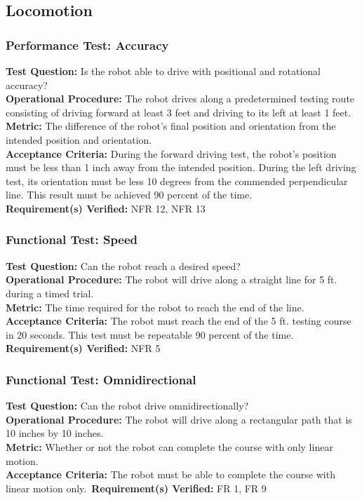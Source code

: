 
\subsection{Locomotion}
\label{sec:verification_locomotion}

\subsubsection{Performance Test: Accuracy}
\label{test:locomotion_pt_accuracy}
\textbf{Test Question:} Is the robot able to drive with positional and rotational accuracy?\\
\textbf{Operational Procedure:} The robot drives along a predetermined testing route consisting of driving forward at least 3 feet and driving to its left at least 1 feet.\\
\textbf{Metric:} The difference of the robot's final position and orientation from the intended position and orientation. \\
\textbf{Acceptance Criteria:} During the forward driving test, the robot's position must be less than 1 inch away from the intended position. During the left driving test, its orientation must be less 10 degrees from the commended perpendicular line. This result must be achieved 90 percent of the time.\\
\textbf{Requirement(s) Verified:} NFR 12, NFR 13

\subsubsection{Functional Test: Speed}
\label{test:locomotion_ft_speed}
\textbf{Test Question:} Can the robot reach a desired speed? \\
\textbf{Operational Procedure:} The robot will drive along a straight line for 5 ft. during a timed trial.\\
\textbf{Metric:} The time required for the robot to reach the end of the line.\\
\textbf{Acceptance Criteria:} The robot must reach the end of the 5 ft. testing course in 20 seconds. This test must be repeatable 90 percent of the time. \\
\textbf{Requirement(s) Verified:} NFR 5

\subsubsection{Functional Test: Omnidirectional}
\label{test:locomotion_ft_omni}
\textbf{Test Question:} Can the robot drive omnidirectionally? \\
\textbf{Operational Procedure:} The robot will drive along a rectangular path that is 10 inches by 10 inches.\\
\textbf{Metric:} Whether or not the robot can complete the course with only linear motion.\\
\textbf{Acceptance Criteria:} The robot must be able to complete the course with linear motion only.\
\textbf{Requirement(s) Verified:} FR 1, FR 9 \\
